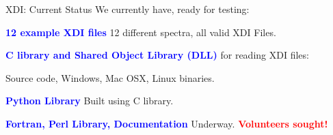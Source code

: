 \documentclass[final]{beamer}
\newcommand{\Color}[2]{{\textcolor{#1}{#2}}}
\newcommand{\BoldRed}[1]{{\Color{Red}{\bf{#1}}}}
\newcommand{\Blue}[1]{{\Color{Blue}{\bf{#1}}}}
\begin{document}
\begin{frame}{}
\begin{columns}[t]
\begin{column}{.54\linewidth}
\begin{block}{\large XDI: Current Status}
          We currently have, ready for testing:
          \begin{center}
            \begin{minipage}{0.9\linewidth}
              \begin{description}[A]
              \item {\Blue{12 example XDI files}} 12 different spectra, all valid  XDI Files.
              \item {\Blue{C library and Shared Object Library (DLL)}}  for
                reading XDI files:\par   {\hspace{10mm}} Source code, Windows, Mac OSX, Linux binaries.
              \item {\Blue{Python Library}}  Built using C library.
              \item {\Blue{Fortran, Perl Library, Documentation}}  Underway.
                {\BoldRed{Volunteers sought!}}
              \end{description}
            \end{minipage}
          \end{center}
          
        \end{block}
      \end{column}

      \begin{column}{.01\linewidth}
      \end{column}


\end{columns}
\end{frame}
\end{document}
